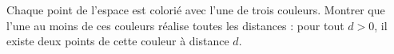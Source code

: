 Chaque point de l'espace est colorié avec l'une de trois couleurs. Montrer que l'une au moins de ces couleurs réalise toutes les distances : pour tout $d > 0$, il existe deux points de cette couleur à distance $d$.
